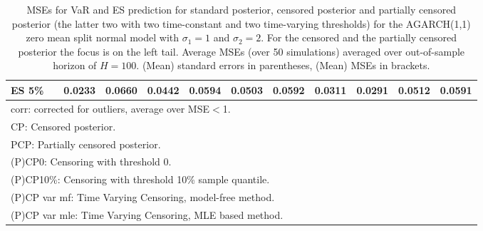 {{\begin{sidewaystable}
\begin{tabular}{cc cc | cccc | cccc}
ES 5\% 
&& 0.0233 & 0.0660 & 0.0442 & 0.0594 & 0.0503 & 0.0592 &0.0311 & 0.0291 & 0.0512 & 0.0591 \\ 
%
%
\hline 
\multicolumn{12}{l}{\footnotesize{corr: corrected for outliers, average over MSE$<$1.}}  \\ 
\multicolumn{12}{l}{\footnotesize{CP: Censored posterior.}}  \\ 
\multicolumn{12}{l}{\footnotesize{PCP: Partially censored posterior.}} \\ 
\multicolumn{12}{l}{\footnotesize{(P)CP0: Censoring with threshold 0.}} \\ 
\multicolumn{12}{l}{\footnotesize{(P)CP10\%: Censoring with threshold 10\% sample quantile.}}  \\ 
\multicolumn{12}{l}{\footnotesize{(P)CP var mf: Time Varying Censoring, model-free method.}} \\ 
\multicolumn{12}{l}{\footnotesize{(P)CP var mle: Time Varying Censoring, MLE based method.}}  \\ 
\end{tabular}
\caption{MSEs for VaR and ES prediction for standard posterior, censored posterior and partially censored posterior (the latter two with two time-constant and two time-varying thresholds) for the AGARCH(1,1) zero mean split normal model with $\sigma_{1} = 1$ and $\sigma_{2} = 2$. For the censored and the partially censored posterior the focus is on the left tail. Average MSEs (over 50 simulations) averaged over out-of-sample horizon of $H=100$. (Mean) standard errors in parentheses, (Mean) MSEs in brackets.} 
\label{tab:agarch11_pcp_var}  
\end{sidewaystable}
}
}